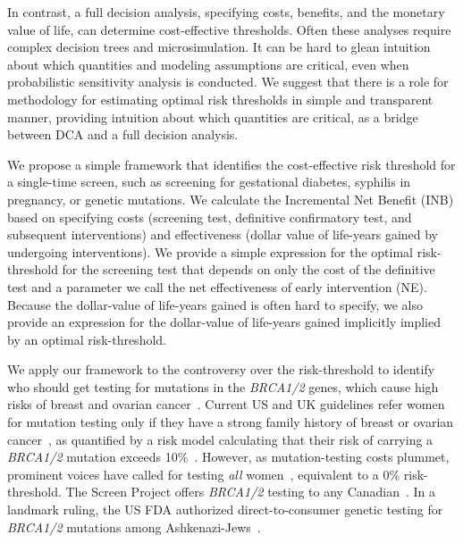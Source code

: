 \documentclass[AMA,STIX1COL]{WileyNJD-v2}
\begin{document}
In contrast, a full decision analysis, specifying costs, benefits, and the monetary value of life, can determine cost-effective thresholds.  Often these analyses require complex decision trees and microsimulation.  It can be hard to glean intuition about which quantities and modeling assumptions are critical, even when probabilistic sensitivity analysis is conducted.  We suggest that there is a role for methodology for estimating optimal risk thresholds in simple and transparent manner, providing intuition about which quantities are critical, as a bridge between DCA and a full decision analysis.   

We propose a simple framework that identifies the cost-effective risk threshold for a single-time screen, such as screening for gestational diabetes, syphilis in pregnancy, or genetic mutations.   We calculate the Incremental Net Benefit (INB) based on specifying costs (screening test, definitive confirmatory test, and subsequent interventions) and effectiveness (dollar value of life-years gained by undergoing interventions).  We provide a simple expression for the optimal risk-threshold for the screening test that depends on only the cost of the definitive test and a parameter we call the net effectiveness of early intervention (NE).  Because the dollar-value of life-years gained is often hard to specify, we also provide an expression for the dollar-value of life-years gained implicitly implied by an optimal risk-threshold.

We apply our framework to the controversy over the risk-threshold to identify who should get testing for mutations in the \textit{BRCA1/2} genes, which cause high risks of breast and ovarian cancer~\citep{Kuchenbaecker2017}.   Current US and UK guidelines refer women for mutation testing only if they have a strong family history of breast or ovarian cancer~\citep{Moyer2014}, as quantified by a risk model calculating that their risk of carrying a \textit{BRCA1/2} mutation exceeds 10\%~\citep{NICE2017}.  However, as mutation-testing costs plummet, prominent voices have called for testing \textit{all} women~\citep{King2014}, equivalent to a 0\% risk-threshold.   The Screen Project offers \textit{BRCA1/2} testing to any Canadian~\citep{TheScreenProject2017}.  In a landmark ruling, the US FDA authorized direct-to-consumer genetic testing for \textit{BRCA1/2} mutations among Ashkenazi-Jews~\citep{Rabin2018}.  %
\end{document}
